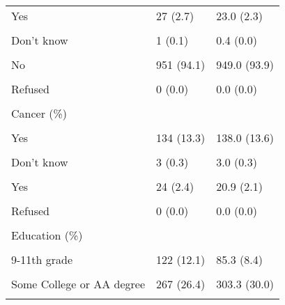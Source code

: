 \begin{table}[!h]
\begin{tabular}[t]{lll}
Yes & 27 (2.7) & 23.0 (2.3)\\
\cellcolor{gray!6}{Refused} & \cellcolor{gray!6}{0 (0.0)} & \cellcolor{gray!6}{0.0 \vphantom{4} (0.0)}\\
Don't know & 1 (0.1) & 0.4 (0.0)\\
\cellcolor{gray!6}{Coronary heart disease (\%)} & \cellcolor{gray!6}{} & \cellcolor{gray!6}{}\\
\addlinespace
No & 951 (94.1) & 949.0 (93.9)\\
\cellcolor{gray!6}{Yes} & \cellcolor{gray!6}{58 (5.7)} & \cellcolor{gray!6}{60.1 (5.9)}\\
Refused & 0 (0.0) & 0.0 \vphantom{3} (0.0)\\
\cellcolor{gray!6}{Don't know} & \cellcolor{gray!6}{2 (0.2)} & \cellcolor{gray!6}{1.9 (0.2)}\\
Cancer (\%) &  & \\
\addlinespace
\cellcolor{gray!6}{No} & \cellcolor{gray!6}{874 (86.4)} & \cellcolor{gray!6}{870.0 (86.1)}\\
Yes & 134 (13.3) & 138.0 (13.6)\\
\cellcolor{gray!6}{Refused} & \cellcolor{gray!6}{0 (0.0)} & \cellcolor{gray!6}{0.0 \vphantom{2} (0.0)}\\
Don't know & 3 (0.3) & 3.0 (0.3)\\
\cellcolor{gray!6}{Stroke (\%)} & \cellcolor{gray!6}{} & \cellcolor{gray!6}{}\\
\addlinespace
Yes & 24 (2.4) & 20.9 (2.1)\\
\cellcolor{gray!6}{No} & \cellcolor{gray!6}{986 (97.5)} & \cellcolor{gray!6}{988.9 (97.8)}\\
Refused & 0 (0.0) & 0.0 \vphantom{1} (0.0)\\
\cellcolor{gray!6}{Don't know} & \cellcolor{gray!6}{1 (0.1)} & \cellcolor{gray!6}{1.1 (0.1)}\\
Education (\%) &  & \\
\addlinespace
\cellcolor{gray!6}{Less than 9th grade} & \cellcolor{gray!6}{140 (13.8)} & \cellcolor{gray!6}{62.7 (6.2)}\\
9-11th grade & 122 (12.1) & 85.3 (8.4)\\
\cellcolor{gray!6}{High school grad/GED or equivalent} & \cellcolor{gray!6}{248 (24.5)} & \cellcolor{gray!6}{268.9 (26.6)}\\
Some College or AA degree & 267 (26.4) & 303.3 (30.0)\\
\cellcolor{gray!6}{College graduate or above} & \cellcolor{gray!6}{234 (23.1)} & \cellcolor{gray!6}{290.8 (28.8)}\\

\end{tabular}
\end{table}
